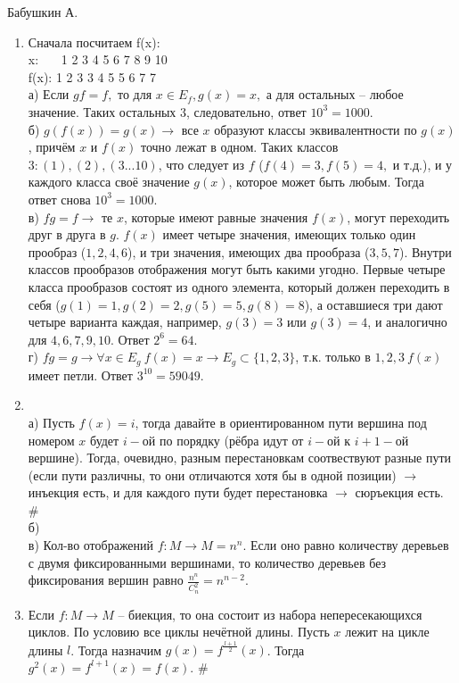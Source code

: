 \documentclass[12pt]{article} %
\begin{document}
Бабушкин А.

\begin{enumerate}
  \setlength{\parskip}{0pt} %
  \setlength{\itemsep}{0pt} %
  \item  Сначала посчитаем f(x):\\
x:~~~ 1 2 3 4 5 6 7 8 9 10\\
f(x): 1 2 3 3 4 5 5 6 7 7 \\
	а) Если $gf = f,$ то для  $x \in E_{f}, g(x) = x,$ а для остальных -- любое значение. Таких остальных $3$, следовательно, ответ $10^3 = 1000$.\\
	б) $g(f(x)) = g(x) \to $  все  $x$ образуют классы эквивалентности по $g(x)$, причём $x$ и $f(x)$ точно лежат в одном. Таких классов $3: (1), (2), (3...10)$, что следует из $f$ ($f(4) = 3, f(5) = 4,$ и т.д.), и у каждого класса своё значение $g(x)$, которое может быть любым. Тогда ответ снова $10^3 = 1000$.  \\
	в) $fg = f \to$ те $x$, которые имеют равные значения $f(x)$, могут переходить друг в друга в $g$. $f(x)$ имеет четыре значения, имеющих только один прообраз ($1, 2, 4, 6$), и три значения, имеющих два прообраза ($3, 5, 7$). Внутри классов прообразов отображения могут быть какими угодно. Первые четыре класса прообразов состоят из одного элемента, который должен переходить в себя ($g(1) = 1, g(2) = 2, g(5) = 5, g(8) = 8$), а оставшиеся три дают четыре варианта каждая, например, $g(3) = 3$ или $g(3) = 4$, и аналогично для $4, 6, 7, 9, 10$. Ответ $2^6 = 64$. \\
	г) $fg = g \to \forall x \in E_{g} ~ f(x) = x \to E_{g} \subset \{1, 2, 3\}$, т.к. только в $1, 2, 3 ~ f(x)$ имеет петли. Ответ $3^{10} = 59049$.
  \item ~\\
	а) Пусть $f(x) = i$, тогда давайте в ориентированном пути вершина под номером $x$  будет $i-$ой по порядку (рёбра идут от $i-$ой к $i+1-$ой вершине). Тогда, очевидно, разным перестановкам соотвествуют разные пути (если пути различны, то они отличаются хотя бы в одной позиции) $\to$ инъекция есть, и для каждого пути будет перестановка $\to$ сюръекция есть. \# \\
	б) \\
	в)  Кол-во отображений $f: M \to M = n^n$. Если оно равно количеству деревьев с двумя фиксированными вершинами, то количество деревьев без фиксирования вершин равно $ \frac {n^n}{C^{2}_{n}} = n^{n - 2}$.\\
  \item Если $f: M \to M$ -- биекция, то она состоит из набора непересекающихся циклов. По условию все циклы нечётной длины. Пусть $x$ лежит на цикле длины $l$. Тогда назначим $g(x) = f^{\frac{l + 1}{2}}(x)$. Тогда $g^{2}(x) = f^{l + 1}(x) = f(x)$. \#

\end{enumerate}
\end{document}
